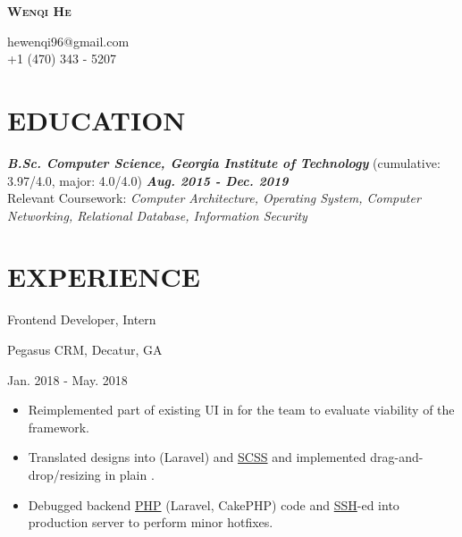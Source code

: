 \documentclass[11pt]{article}
\newcommand{\centertitle}[3]{
	{\noindent\bfseries\itshape
	\parbox[][0.5em][b]{0.35\textwidth}{#1\hfill}%
	\parbox[][0.5em][b]{0.3\textwidth}{\centerline{#2}}%
	\parbox[][0.5em][b]{0.35\textwidth}{\hfill#3}}
}
\begin{document}
\noindent
\parbox{0.3\textwidth}{\quad}
\parbox{0.4\textwidth}{\centerline{\Huge\scshape\bfseries Wenqi He}}
\parbox{0.3\textwidth}{hewenqi96@gmail.com\\+1 (470) 343 - 5207}

\section*{EDUCATION}
{\bfseries\itshape B.Sc. Computer Science, Georgia Institute of Technology} \enspace (cumulative: 3.97/4.0, major: 4.0/4.0) \hfill {\itshape\bfseries Aug. 2015 - Dec. 2019}\\
{Relevant Coursework: \textit{Computer Architecture, Operating System, Computer Networking, Relational Database, Information Security}}

\vspace{-0.5em}

\section*{EXPERIENCE}
\centertitle{Frontend Developer, Intern}{Pegasus CRM, Decatur, GA}{Jan. 2018 - May. 2018}
\begin{itemize}[leftmargin=15pt, noitemsep, topsep=0pt]
\item Reimplemented part of existing UI in \underline{} for the team to evaluate viability of the framework.
\item Translated designs into \underline{} (Laravel) and \underline{SCSS} and implemented drag-and-drop/resizing in plain \underline{}.
\item Debugged backend \underline{PHP} (Laravel, CakePHP) code and \underline{SSH}-ed into production server to perform minor hotfixes.
\end{itemize}
\vspace{-0.5em}
\end{document}
